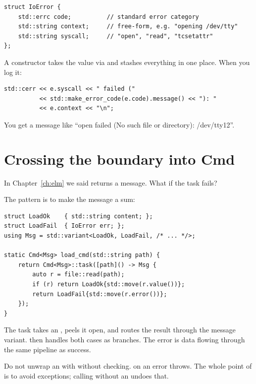 \begin{lstlisting}
struct IoError {
    std::errc code;          // standard error category
    std::string context;     // free-form, e.g. "opening /dev/tty"
    std::string syscall;     // "open", "read", "tcsetattr"
};
\end{lstlisting}

A constructor takes the  value via
 and stashes everything in one
place. When you log it:

\begin{lstlisting}
std::cerr << e.syscall << " failed ("
          << std::make_error_code(e.code).message() << "): "
          << e.context << "\n";
\end{lstlisting}

You get a message like ``open failed (No such file or
directory): /dev/tty12''.

\section{Crossing the boundary into Cmd}

In Chapter~\ref{ch:elm} we said  returns a message.
What if the task fails?

The pattern is to make the message a sum:

\begin{lstlisting}
struct LoadOk    { std::string content; };
struct LoadFail  { IoError err; };
using Msg = std::variant<LoadOk, LoadFail, /* ... */>;

static Cmd<Msg> load_cmd(std::string path) {
    return Cmd<Msg>::task([path]() -> Msg {
        auto r = file::read(path);
        if (r) return LoadOk{std::move(r.value())};
        return LoadFail{std::move(r.error())};
    });
}
\end{lstlisting}

The task takes an , peels it open, and routes the
result through the message variant.  then handles
both cases as branches. The error is data flowing through the
same pipeline as success.

\begin{warning}
Do not unwrap an  with  without
checking.  on an error throws. The whole point of
 is to avoid exceptions; calling 
without an  undoes that.
\end{warning}


